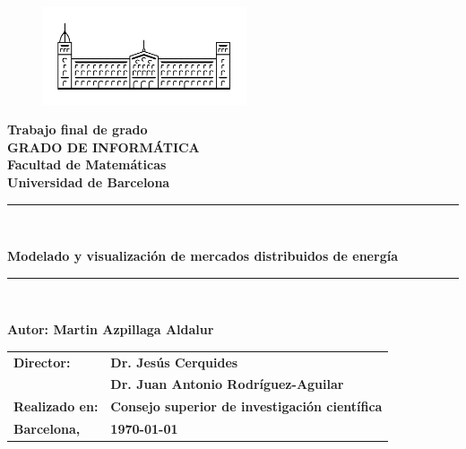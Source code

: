 \documentclass[12pt,a4paper,openright,oneside]{article}
\numberwithin{equation}{section}
\theoremstyle{definition}
\begin{document}

\thispagestyle{empty}

\begin{titlepage}
\begin{center}
\begin{figure}[htb]
\begin{center}
\includegraphics[width=6cm]{ub.png}
\end{center}
\end{figure}

\textbf{\LARGE Trabajo final de grado} \\
\vspace*{.5cm}
\textbf{\LARGE GRADO DE INFORMÁTICA } \\
\vspace*{.5cm}
\textbf{\LARGE Facultad de Matemáticas \\ Universidad de Barcelona} \\
\vspace*{1.5cm}
\rule{16cm}{0.1mm}\\
\begin{Huge}
\textbf{Modelado y visualización de mercados distribuidos de energía} \\
\end{Huge}
\rule{16cm}{0.1mm}\\

\vspace{1cm}

\begin{flushright}
\textbf{\LARGE Autor: Martin Azpillaga Aldalur}

\vspace*{2cm}

\renewcommand{\arraystretch}{1.5}
\begin{tabular}{ll}
\textbf{\Large Director:} & \textbf{\Large Dr. Jesús Cerquides } \\
& \textbf{\Large Dr. Juan Antonio Rodríguez-Aguilar}\\
\textbf{\Large Realizado en:} & \textbf{\Large Consejo superior de investigación científica}\\
\textbf{\Large Barcelona,} & \textbf{\Large \today }
\end{tabular}

\end{flushright}

\end{center}

\end{titlepage}
\end{document}
